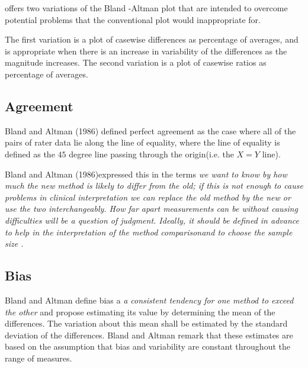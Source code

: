 \documentclass[12pt, a4paper]{report}
\begin{document}
	\citet{BA99} offers two variations of the Bland -Altman plot that
	are intended to overcome potential problems that the conventional
	plot would inappropriate for.
	
	The first variation is a plot of casewise differences as
	percentage of averages, and is appropriate when there is an
	increase in variability of the differences as the magnitude
	increases. The second variation is a plot of casewise ratios as
	percentage of averages.
	
	
	
	
	
	
	
	\subsection{Agreement} Bland and Altman (1986) defined perfect
	agreement as the case where all of the pairs of rater data lie
	along the line of equality, where the line of equality is defined
	as the $45$ degree line passing through the origin(i.e. the $X=Y$
	line).
	
	Bland and Altman (1986)expressed this in the terms \emph{we want
		to know by how much the new method is likely to differ from the
		old; if this is not enough to cause problems in clinical
		interpretation we can replace the old method by the new or use the
		two interchangeably. How far apart measurements can be without
		causing difficulties will be a question of judgment. Ideally, it
		should be defined in advance to help in the interpretation of the
		method comparisonand to choose the sample size .}
	\subsection{Bias}
	Bland and Altman define bias a \emph{a consistent tendency for one
		method to exceed the other} and propose estimating its value
	by determining the mean of the differences. The variation about
	this mean shall be estimated by the  standard deviation of the
	differences. Bland and Altman remark that these estimates are based on the
	assumption that bias and variability are constant throughout the
	range of measures.
\end{document}
